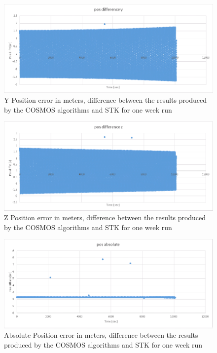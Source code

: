 \documentclass[12pt,letterpaper]{paper}
\begin{document}
\begin{figure}
\centering
\includegraphics[width=0.9\linewidth]{figures/compare_cosmos_stk_tle2gcrf_pos_error_y}
\caption{Y Position error in meters, difference between the results produced by the COSMOS algorithms and STK for one week run}
\label{fig:compare_cosmos_stk_tle2gcrf_pos_error_y}
\end{figure}


\begin{figure}
\centering
\includegraphics[width=0.9\linewidth]{figures/compare_cosmos_stk_tle2gcrf_pos_error_z}
\caption{Z Position error in meters, difference between the results produced by the COSMOS algorithms and STK for one week run}
\label{fig:compare_cosmos_stk_tle2gcrf_pos_error_z}
\end{figure}


\begin{figure}
\centering
\includegraphics[width=0.9\linewidth]{figures/compare_cosmos_stk_tle2gcrf_pos_error_abs}
\caption{Absolute Position error in meters, difference between the results produced by the COSMOS algorithms and STK for one week run}
\label{fig:compare_cosmos_stk_tle2gcrf_pos_error_abs}
\end{figure}
\end{document}

